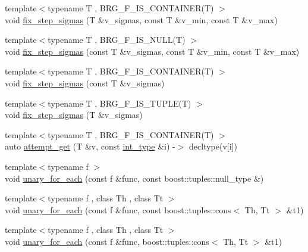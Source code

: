 \begin{DoxyCompactItemize}
\item 
{\footnotesize template$<$typename T , B\+R\+G\+\_\+\+F\+\_\+\+I\+S\+\_\+\+C\+O\+N\+T\+A\+I\+N\+E\+R(\+T) $>$ }\\void \hyperlink{namespaceIceBRG_ab5f6386b56383dcac68a24808b83fb6c}{fix\+\_\+step\+\_\+sigmas} (T \&v\+\_\+sigmas, const T \&v\+\_\+min, const T \&v\+\_\+max)
\item 
{\footnotesize template$<$typename T , B\+R\+G\+\_\+\+F\+\_\+\+I\+S\+\_\+\+N\+U\+L\+L(\+T) $>$ }\\void \hyperlink{namespaceIceBRG_aebcfb0c04e9854acc78a326c43785560}{fix\+\_\+step\+\_\+sigmas} (const T \&v\+\_\+sigmas, const T \&v\+\_\+min, const T \&v\+\_\+max)
\item 
{\footnotesize template$<$typename T , B\+R\+G\+\_\+\+F\+\_\+\+I\+S\+\_\+\+C\+O\+N\+T\+A\+I\+N\+E\+R(\+T) $>$ }\\void \hyperlink{namespaceIceBRG_a8e7080546dfa40b9457149562d7c81ed}{fix\+\_\+step\+\_\+sigmas} (const T \&v\+\_\+sigmas)
\item 
{\footnotesize template$<$typename T , B\+R\+G\+\_\+\+F\+\_\+\+I\+S\+\_\+\+T\+U\+P\+L\+E(\+T) $>$ }\\void \hyperlink{namespaceIceBRG_a0269eb85770d5903ad410f3732145184}{fix\+\_\+step\+\_\+sigmas} (T \&v\+\_\+sigmas)
\item 
{\footnotesize template$<$typename T , B\+R\+G\+\_\+\+F\+\_\+\+I\+S\+\_\+\+C\+O\+N\+T\+A\+I\+N\+E\+R(\+T) $>$ }\\auto \hyperlink{namespaceIceBRG_ad3b1d7b5ca59996a7e966e1460b3ee10}{attempt\+\_\+get} (T \&v, const \hyperlink{lib_2IceBRG__main_2common_8h_ac4de9d9335536ac22821171deec8d39e}{int\+\_\+type} \&i) -\/$>$ decltype(v\mbox{[}i\mbox{]})
\item 
{\footnotesize template$<$typename f $>$ }\\void \hyperlink{namespaceIceBRG_a3ce931aa21aaf3aa29d3d6b7f18572af}{unary\+\_\+for\+\_\+each} (const f \&func, const boost\+::tuples\+::null\+\_\+type \&)
\item 
{\footnotesize template$<$typename f , class Th , class Tt $>$ }\\void \hyperlink{namespaceIceBRG_ad343ae0a099d104a93327826bd0b3ae6}{unary\+\_\+for\+\_\+each} (const f \&func, const boost\+::tuples\+::cons$<$ Th, Tt $>$ \&t1)
\item 
{\footnotesize template$<$typename f , class Th , class Tt $>$ }\\void \hyperlink{namespaceIceBRG_a0972f52ef0036f145d36ef72fe30c0cd}{unary\+\_\+for\+\_\+each} (const f \&func, boost\+::tuples\+::cons$<$ Th, Tt $>$ \&t1)

\end{DoxyCompactItemize}
